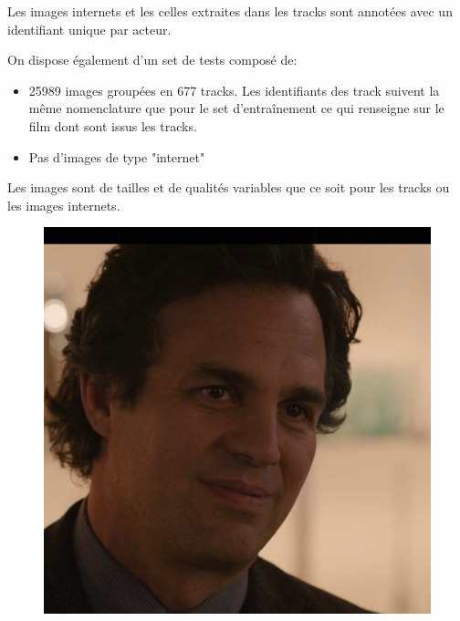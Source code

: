 \documentclass[12pt,french]{report}
\begin{document}
Les images internets et les celles extraites dans les tracks sont annotées avec un identifiant unique par acteur.

On dispose également d'un set de tests composé de:
\begin{itemize}
	\item 25989 images groupées en 677 tracks. Les identifiants des track suivent la même nomenclature que pour le set d'entraînement ce qui renseigne sur le film dont sont issus les tracks. 
	\item Pas d'images de type "internet"
\end{itemize}


Les images sont de tailles et de qualités variables que ce soit pour les tracks ou les images internets.

\begin{figure}[h]
	\begin{minipage}[t]{.47\linewidth}
		\begin{center}%
			\includegraphics[width= \textwidth]{image_rapport/275.jpg}
		\end{center}%
	\end{minipage}
	\hfill
	\begin{minipage}[t]{.47\linewidth}
		\begin{center}%

\end{center}
\end{minipage}
\end{figure}
\end{document}
